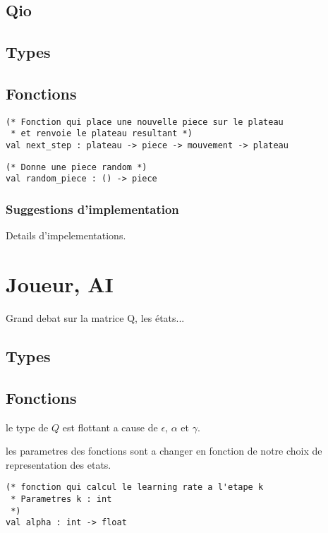 \documentclass{article}
\begin{document}
\subsection{Qio}


\subsection{Types}


\subsection{Fonctions}


\begin{lstlisting}[frame=L]
(* Fonction qui place une nouvelle piece sur le plateau
 * et renvoie le plateau resultant *)
val next_step : plateau -> piece -> mouvement -> plateau
\end{lstlisting}

\begin{lstlisting}[frame=L]
(* Donne une piece random *)
val random_piece : () -> piece
\end{lstlisting}

\subsubsection{Suggestions d'implementation}

Details d'impelementations.

\section{Joueur, AI}

Grand debat sur la matrice Q, les états...

\subsection{Types}

\subsection{Fonctions}

\danger{} le type de \( Q \) est flottant a cause de \( \epsilon \), \( \alpha \) et \( \gamma \).

\noindent
\danger{} les parametres des fonctions sont a changer en fonction de notre
choix de representation des etats.

\begin{lstlisting}[frame=L]
(* fonction qui calcul le learning rate a l'etape k
 * Parametres k : int
 *)
val alpha : int -> float
\end{lstlisting}
\end{document}
